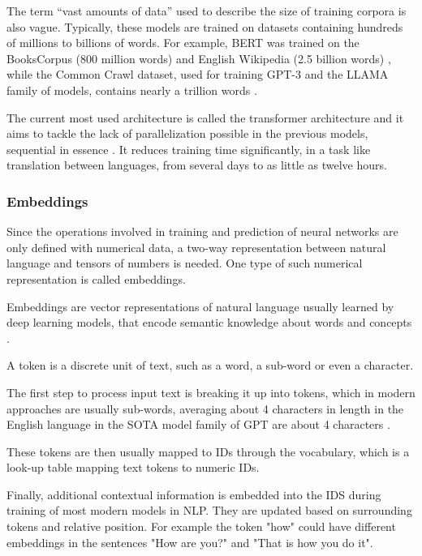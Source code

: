The term ``vast amounts of data'' used to describe the size of training corpora is also vague. Typically, these models are trained on datasets containing hundreds of millions to billions of words. For example, BERT was trained on the BooksCorpus (800 million words) and English Wikipedia (2.5 billion words) \cite{devlin2019bert}, while the Common Crawl dataset, used for training GPT-3 and the LLAMA family of models, contains nearly a trillion words \cite{brown2020languagemodelsfewshotlearners,touvron2023llamaopenefficientfoundation}.

The current most used architecture is called the transformer architecture and it aims to tackle the lack of parallelization possible in the previous models, sequential in essence \cite{vaswani2017attention}. It reduces training time significantly, in a task like translation between languages, from several days \cite{bahdanau2014neural} to as little as twelve hours.

\subsubsection{Embeddings}

Since the operations involved in training and prediction of neural networks are only defined with numerical data, a two-way representation between natural language and tensors of numbers is needed. One type of such numerical representation is called embeddings.

\begin{definition}
    Embeddings are vector representations of natural language usually learned by deep learning models, that encode semantic knowledge about words and concepts \cite{goodfellow2016deep}.
\end{definition}

A token is a discrete unit of text, such as a word, a sub-word or even a character.

The first step to process input text is breaking it up into tokens, which in modern approaches are usually sub-words, averaging about 4 characters in length in the English language in the SOTA model family of GPT are about 4 characters \cite{OpenAITokens}.

These tokens are then usually mapped to IDs through the vocabulary, which is a look-up table mapping text tokens to numeric IDs.

Finally, additional contextual information is embedded into the IDS during training of most modern models in NLP. They are updated based on surrounding tokens and relative position. For example the token "how" could have different embeddings in the sentences "How are you?" and "That is how you do it".


